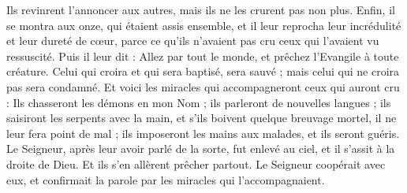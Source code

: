 \begin{multicols}{2}
Ils revinrent l’annoncer aux autres, mais ils ne les crurent pas non plus.
Enfin, il se montra aux onze, qui étaient assis ensemble, et il leur reprocha leur incrédulité et leur dureté de cœur, parce ce qu'ils n'avaient pas cru ceux qui l'avaient vu ressuscité.
Puis il leur dit : Allez par tout le monde, et prêchez l'Evangile à toute créature.
Celui qui croira et qui sera baptisé, sera sauvé ; mais celui qui ne croira pas sera condamné.
Et voici les miracles qui accompagneront ceux qui auront cru : Ils chasseront les démons en mon Nom ; ils parleront de nouvelles langues ;
ils saisiront les serpents avec la main, et s’ils boivent quelque breuvage mortel, il ne leur fera point de mal ; ils imposeront les mains aux malades, et ils seront guéris.
Le Seigneur, après leur avoir parlé de la sorte, fut enlevé au ciel, et il s'assit à la droite de Dieu.
Et ils s’en allèrent prêcher partout. Le Seigneur coopérait avec eux, et confirmait la parole par les miracles qui l'accompagnaient.
\PPE{}
\end{multicols}
